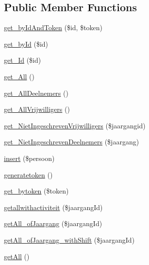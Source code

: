 \subsection*{Public Member Functions}
\begin{DoxyCompactItemize}
\item 
\mbox{\hyperlink{class_persoon__model_af6238e2ada132ef41f5ab612f027c879}{get\+\_\+by\+Id\+And\+Token}} (\$id, \$token)
\item 
\mbox{\hyperlink{class_persoon__model_a0b88e4e63e880d5c6a5c18a12ac21272}{get\+\_\+by\+Id}} (\$id)
\item 
\mbox{\hyperlink{class_persoon__model_ac4bd47d927cdbaa39a26b723f4c15aa7}{get\+\_\+\+Id}} (\$id)
\item 
\mbox{\hyperlink{class_persoon__model_abf1694b8c451d02fb36b9fe6d6f54245}{get\+\_\+\+All}} ()
\item 
\mbox{\hyperlink{class_persoon__model_af681009d10a4938d8df855aaadff3f8c}{get\+\_\+\+All\+Deelnemers}} ()
\item 
\mbox{\hyperlink{class_persoon__model_a3ec3c4838d03ea025746333367305dfc}{get\+\_\+\+All\+Vrijwilligers}} ()
\item 
\mbox{\hyperlink{class_persoon__model_adc89349e61542f626e55f722d5c09c98}{get\+\_\+\+Niet\+Ingeschreven\+Vrijwilligers}} (\$jaargangid)
\item 
\mbox{\hyperlink{class_persoon__model_a57ca8d2df6874e19154b614986f1a7a5}{get\+\_\+\+Niet\+Ingeschreven\+Deelnemers}} (\$jaargang)
\item 
\mbox{\hyperlink{class_persoon__model_a2c311e5cb508141c1bae2566b3169615}{insert}} (\$persoon)
\item 
\mbox{\hyperlink{class_persoon__model_ae56b3007dd99ca0a98820a33228fc87a}{generatetoken}} ()
\item 
\mbox{\hyperlink{class_persoon__model_a779aefc3d6ce88de6a5f5eb9be057883}{get\+\_\+bytoken}} (\$token)
\item 
\mbox{\hyperlink{class_persoon__model_a72d8c06b34d07ca558ec53c759996b60}{getallwithactiviteit}} (\$jaargang\+Id)
\item 
\mbox{\hyperlink{class_persoon__model_ad60023155e1b4bf3279227284647bc2d}{get\+All\+\_\+of\+Jaargang}} (\$jaargang\+Id)
\item 
\mbox{\hyperlink{class_persoon__model_abe2394803431cfb447887c36bba2b8eb}{get\+All\+\_\+of\+Jaargang\+\_\+with\+Shift}} (\$jaargang\+Id)
\item 
\mbox{\hyperlink{class_persoon__model_a82a921cf28a86b52a32d48235e30c0f1}{get\+All}} ()
\end{DoxyCompactItemize}


